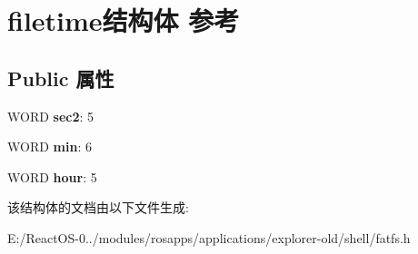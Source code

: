 \hypertarget{structfiletime}{}\section{filetime结构体 参考}
\label{structfiletime}
\subsection*{Public 属性}
\begin{DoxyCompactItemize}
\item 
\mbox{\label{structfiletime_a1fa458d70e506261c4feaa27ae1f3840}} 
W\+O\+RD {\bfseries sec2}\+: 5
\item 
\mbox{\label{structfiletime_a4ae8c74ff64e460e1674a1919cde6f92}} 
W\+O\+RD {\bfseries min}\+: 6
\item 
\mbox{\label{structfiletime_a0e50d305f751fb988d5c666f27a5a537}} 
W\+O\+RD {\bfseries hour}\+: 5
\end{DoxyCompactItemize}


该结构体的文档由以下文件生成\+:\begin{DoxyCompactItemize}
\item 
E\+:/\+React\+O\+S-\/0../modules/rosapps/applications/explorer-\/old/shell/fatfs.\+h\end{DoxyCompactItemize}
